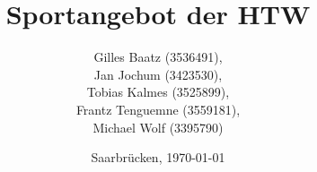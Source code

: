 \begin{titlepage}

	\titlehead
	{
		\hfill
		\texttt{[image: images/logos/HTW.png]}
		\hfill
	}
	
	\subject
	{
		\Huge Dokumentation\\
		\normalsize Semantische Interoperabilit\"at\\
	}
	
	\title
	{
		Sportangebot der HTW
	}
	
	\author
	{		
		Gilles Baatz (3536491),\\
		Jan Jochum (3423530),\\
		Tobias Kalmes (3525899),\\
		Frantz Tenguemne (3559181),\\
		Michael Wolf (3395790)		
	}
	
	\date
	{
		\normalsize{Saarbrücken, \today}
	}	
	\maketitle	
\end{titlepage}
